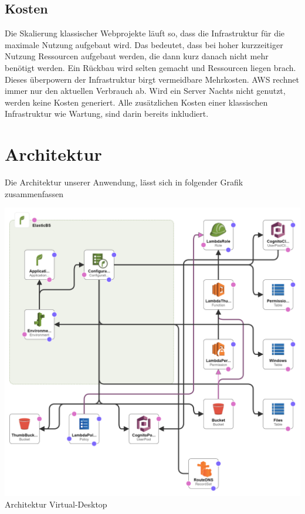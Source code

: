 \documentclass[a4paper, 12pt]{scrreprt}
\renewcommand\_{\textunderscore\allowbreak}
\begin{document}
\section{Kosten}
Die Skalierung klassischer Webprojekte läuft so, dass die Infrastruktur für die maximale Nutzung aufgebaut wird. Das bedeutet, dass bei hoher kurzzeitiger Nutzung Ressourcen aufgebaut werden, die dann kurz danach nicht mehr benötigt werden. Ein Rückbau wird selten gemacht und Ressourcen liegen brach.\\
Dieses überpowern der Infrastruktur birgt vermeidbare Mehrkosten. AWS rechnet immer nur den aktuellen Verbrauch ab. Wird ein Server Nachts nicht genutzt, werden keine Kosten generiert. Alle zusätzlichen Kosten einer klassischen Infrastruktur wie Wartung, sind darin bereits inkludiert. 
\chapter{Architektur}

Die Architektur unserer Anwendung, lässt sich in folgender Grafik zusammenfassen

\includegraphics[scale=0.24]{template1-designer.png} 
Architektur Virtual-Desktop
\end{document}
